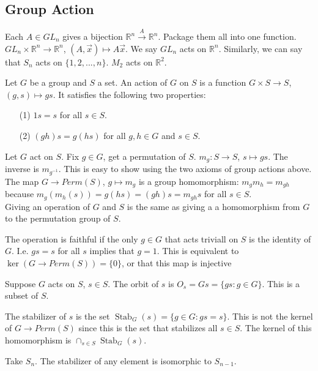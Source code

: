 \documentclass{article}
\newcommand{\R}{\mathbb{R}}
\newcommand{\ra}[1][]{\xrightarrow{#1}}
\DeclareMathOperator{\Stab}{Stab}
\begin{document}
\subsection{Group Action}
Each $A\in GL_n$ gives a bijection $\R^n\ra[A]\R^n$. Package them all into one function. $GL_n\times \R^n\ra\R^n$, $(A,\vec{x})\mapsto A\vec{x}$. We say $GL_n$ acts on $\R^n$. Similarly, we can say that $S_n$ acts on $\{1,2,...,n\}$. $M_2$ acts on $\R^2$. 
\begin{definition}
Let $G$ be a group and $S$ a set. An action of $G$ on $S$ is a function $G\times S\ra S$, $(g,s)\mapsto gs$. It satisfies the following two properties:
\begin{enumerate}
    \item[(1)] $1s=s$ for all $s\in S$.
    \item[(2)] $(gh)s=g(hs)$ for all $g,h\in G$ and $s\in S$. 
\end{enumerate}
\end{definition}
Let $G$ act on $S$. Fix $g\in G$, get a permutation of $S$. $m_g:S\ra S$, $s\mapsto gs$. The inverse is $m_{g^{-1}}$. This is easy to show using the two axioms of group actions above.\\
The map $G\ra Perm(S)$, $g\mapsto m_g$ is a group homomorphism: $m_gm_h=m_{gh}$ because $m_g(m_h(s))=g(hs)=(gh)s=m_{gh}s$ for all $s\in S$. \\
Giving an operation of $G$ and $S$ is the same as giving a a homomorphism from $G$ to the permutation group of $S$. 
\begin{definition}
The operation  is faithful if the only $g\in G$ that acts triviall on $S$ is the identity of $G$. I.e. $gs=s$ for all $s$ implies that $g=1$. This is equivalent to $\ker(G\ra Perm(S))=\{0\}$, or that this map is injective
\end{definition}
\begin{definition}
Suppose $G$ acts on $S$, $s\in S$. The orbit of $s$ is $O_s=Gs=\{gs:g\in G\}$. This is a subset of $S$. 
\end{definition}
\begin{definition}
The stabilizer of $s$ is the set $\Stab_G(s)=\{g\in G: gs=s\}$. This is not the kernel of $G\ra Perm(S)$ since this is the set that stabilizes all $s\in S$. The kernel of this homomorphism is $\cap_{s\in S}\Stab_G(s)$. 
\end{definition}
\begin{example}
Take $S_n$. The stabilizer of any element is isomorphic to $S_{n-1}$.
\end{example}
\end{document}
